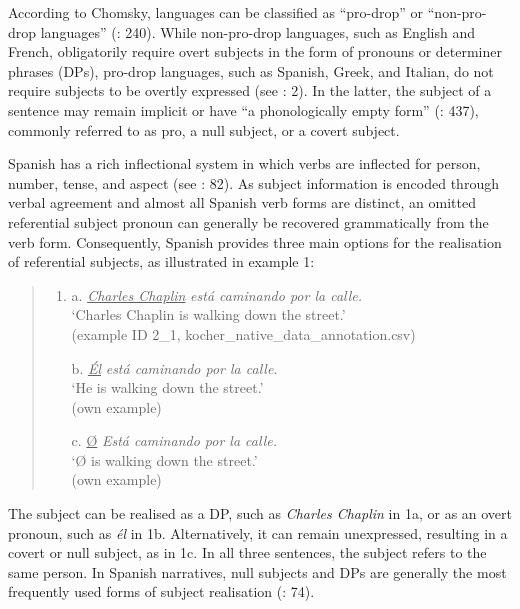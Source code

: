 \documentclass[
  letterpaper,
  DIV=11,
  numbers=noendperiod]{scrartcl}
\begin{document}
According to Chomsky, languages can be classified as ``pro-drop'' or
``non-pro-drop languages'' (: 240).
While non-pro-drop languages, such as English and French, obligatorily
require overt subjects in the form of pronouns or determiner phrases
(DPs), pro-drop languages, such as Spanish, Greek, and Italian, do not
require subjects to be overtly expressed (see
: 2). In the latter, the subject of a sentence may remain
implicit or have ``a phonologically empty form''
(: 437), commonly referred to as pro, a null subject, or a covert
subject.

Spanish has a rich inflectional system in which verbs are inflected for
person, number, tense, and aspect (see : 82). As subject information is encoded through verbal agreement
and almost all Spanish verb forms are distinct, an omitted referential
subject pronoun can generally be recovered grammatically from the verb
form. Consequently, Spanish provides three main options for the
realisation of referential subjects, as illustrated in example 1:

\begin{quote}
\begin{enumerate}
\def\labelenumi{(\arabic{enumi})}
\item
  a. \ul{\emph{Charles Chaplin}} \emph{está caminando por la calle.}\\
  `Charles Chaplin is walking down the street.'\\
  (example ID 2\_1, kocher\_native\_data\_annotation.csv)

  b. \ul{\emph{Él}} \emph{está caminando por la calle.}\\
  `He is walking down the street.'\\
  (own example)

  c. \ul{Ø} \emph{Está caminando por la calle.}\\
  `Ø is walking down the street.'\\
  (own example)
\end{enumerate}
\end{quote}

The subject can be realised as a DP, such as \emph{Charles Chaplin} in
1a, or as an overt pronoun, such as \emph{él} in 1b. Alternatively, it
can remain unexpressed, resulting in a covert or null subject, as in 1c.
In all three sentences, the subject refers to the same person. In
Spanish narratives, null subjects and DPs are generally the most
frequently used forms of subject realisation
(: 74).
\end{document}

